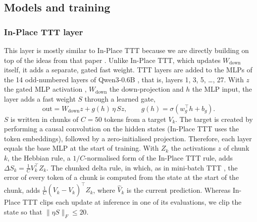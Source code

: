 \documentclass[10pt]{article} %
\begin{document}
\subsection{Models and training}

\subsubsection{In-Place TTT layer}
\label{sec-inplace}
This layer is mostly similar to In-Place TTT because we are directly building on top of the ideas from that paper \citep{feng2026inplace}. Unlike In-Place TTT, which updates $W_{\mathrm{down}}$ itself, it adds a separate, gated fast weight. TTT layers are added to the MLPs of the 14 odd-numbered layers of Qwen3-0.6B \citep{yang2025qwen3}, that is, layers 1, 3, 5, \dots, 27. With $z$ the gated MLP activation \citep{shazeer2020glu}, $W_{\mathrm{down}}$ the down-projection and $h$ the MLP input, the layer adds a fast weight $S$ through a learned gate,
\begin{equation}
  \mathrm{out} = W_{\mathrm{down}} z + g(h)\, \eta\, S z , \qquad g(h) = \sigma(w_g^\top h + b_g).
\end{equation}
$S$ is written in chunks of $C = 50$ tokens from a target $V_k$. The target is created by performing a causal convolution on the hidden states (In-Place TTT uses the token embeddings), followed by a zero-initialised projection. Therefore, each layer equals the base MLP at the start of training. With $Z_k$ the activations $z$ of chunk $k$, the Hebbian rule, a $1/C$-normalised form of the In-Place TTT rule, adds $\Delta S_k = \tfrac{1}{C} V_k^\top Z_k$. The chunked delta rule, in which, as in mini-batch TTT \citep{sun2025learning}, the error of every token of a chunk is computed from the state at the start of the chunk, adds $\tfrac{1}{C}(V_k - \hat V_k)^\top Z_k$, where $\hat V_k$ is the current prediction. Whereas In-Place TTT clips each update at inference in one of its evaluations, we clip the state so that $\lVert \eta S \rVert_F \le 20$.
\end{document}

